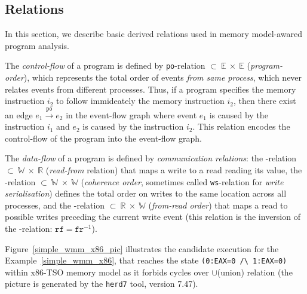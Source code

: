 \subsection{Relations}
\label{ch:wmm:model:relations}

In this section, we describe basic derived relations used in memory model-awared program analysis.

The \textit{control-flow} of a program is defined by \texttt{po}-relation $\subset~\mathbb{E}~\times~\mathbb{E}$ (\textit{program-order}), which represents the total order of events \textit{from same process}, which never relates events from different processes.
Thus, if a program specifies the memory instruction $i_2$ to follow immideately the memory instruction $i_2$, then there exist an edge $e_1 \xrightarrow{\mathtt{po}} e_2$ in the event-flow graph where event $e_1$ is caused by the instruction $i_1$ and $e_2$ is caused by the instruction $i_2$. This relation encodes the control-flow of the program into the event-flow graph.

The \textit{data-flow} of a program is defined by \textit{communication relations}: the \rf-relation $\subset~\mathbb{W}~\times~\mathbb{R}$ (\textit{read-from} relation) that maps a write to a read reading its value, the \co-relation $\subset~\mathbb{W}~\times~\mathbb{W}$ (\textit{coherence order}, sometimes called \texttt{ws}-relation for \textit{write serialisation}) defines the total order on writes to the same location across all processes, and the \fr-relation $\subset~\mathbb{R}~\times~\mathbb{W}$ (\textit{from-read order}) that maps a read to possible writes preceding the current write event (this relation is the inversion of the \rf-relation: $\mathtt{rf} = \mathtt{fr}^{-1}$).

Figure~\ref{simple_wmm_x86_pic} illustrates the candidate execution for the Example~\ref{simple_wmm_x86}, that reaches the state \texttt{(0:EAX=0~/\textbackslash~1:EAX=0)} within x86-TSO memory model as it forbids cycles over \po$\cup$\rf (union) relation (the picture is generated by the \texttt{herd7} tool, version 7.47). 

